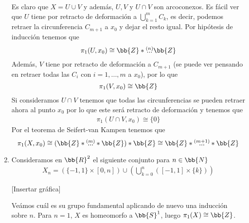 \begin{ejemplo}
\begin{enumerate}
\begin{figure}[H]
        \end{figure}
        Es claro que $X=U\cup V$ y además, $U,V$ y $U\cap V$ son arcoconexos. Es fácil ver que $U$ tiene por retracto de deformación a $\bigcup_{k=1}^{m}C_k$, es decir, podemos retraer la circunferencia $C_{m+1}$ a $x_0$ y dejar el resto igual. Por hipótesis de inducción tenemos que
        \begin{gather*}
            \pi_1(U,x_0) \cong \bb{Z} \ast \overset{(n)}{...} \bb{Z}
        \end{gather*}
        Además, $V$ tiene por retracto de deformación a $C_{m+1}$ (se puede ver pensando en retraer todas las $C_i$ con $i=1,...,m$ a $x_0$), por lo que 
        \begin{gather*}
            \pi_1(V,x_0)\cong \bb{Z}
        \end{gather*}
        Si consideramos $U\cap V$ tenemos que todas las circunferencias se pueden retraer ahora al punto $x_0$ por lo que este será retracto de deformación y tenemos que
        \begin{gather*}
            \pi_1(U\cap V, x_0) \cong \{0\}
        \end{gather*}
        Por el teorema de Seifert-van Kampen tenemos que 
        \begin{gather*}
            \pi_1(X,x_0) \cong (\bb{Z} \ast \overset{(m)}{...}\ast \bb{Z}) \ast \bb{Z} \cong \bb{Z} \ast \overset{(m+1)}{...}\ast \bb{Z}
        \end{gather*}

        \item Consideramos en $\bb{R}^2$ el siguiente conjunto para $n\in \bb{N}$
        \begin{gather*}
            X_n=(\{-1,1\}\times [0,n]) \cup \left(\bigcup\limits_{k=0}^n([-1,1]\times\{k\})\right)
        \end{gather*}

        [Insertar gráfica]

        Veámos cuál es su grupo fundamental aplicando de nuevo una inducción sobre $n$. Para $n=1$, $X$ es homeomorfo a $\bb{S}^1$, luego $\pi_1(X)\cong \bb{Z}$.\\


\end{enumerate}
\end{ejemplo}
